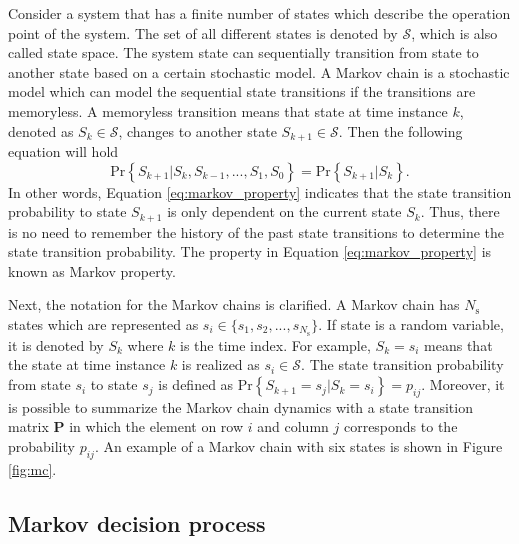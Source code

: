 \documentclass[english, 12pt, a4paper, elec, utf8, a-1b, online]{aaltothesis}
\renewcommand{\vec}[1]{\mathbf{#1}}
\newcommand{\Ss}{\mathcal{S}}
\renewcommand{\Pr}[1]{\text{Pr}\left\{ #1 \right\}}
\newcommand{\stprobs}{\vec{P}}
\newcommand{\nstates}{{N_\text{s}}}
\begin{document}
Consider a system that has a finite number of states which describe the operation point of the system.
The set of all different states is denoted by $\Ss$, which is also called state space.
The system state can sequentially transition from state to another state based on a certain stochastic model.
A Markov chain is a stochastic model which can model the sequential state transitions if the transitions are memoryless.
A memoryless transition means that state at time instance $k$, denoted as $S_k \in \Ss$, changes to another state $S_{k+1} \in \Ss$.
Then the following equation will hold   
\begin{equation} \label{eq:markov_property}
    \Pr{S_{k+1} | S_k, S_{k-1}, ..., S_1, S_0} = \Pr{S_{k+1} | S_k}.
\end{equation}
In other words, Equation \eqref{eq:markov_property} indicates that the state transition probability to state $S_{k+1}$ is only dependent on the current state $S_k$.
Thus, there is no need to remember the history of the past state transitions to determine the state transition probability.
The property in Equation \eqref{eq:markov_property} is known as Markov property.

Next, the notation for the Markov chains is clarified.
A Markov chain has $\nstates$ states which are represented as $s_i \in \{s_1, s_2, ..., s_{\nstates} \}$.
If state is a random variable, it is denoted by $S_k$ where $k$ is the time index.
For example, $S_k = s_i$ means that the state at time instance $k$ is realized as $s_i \in \Ss$. 
The state transition probability from state $s_i$ to state $s_j$ is defined as $\Pr{S_{k+1}=s_j | S_{k}=s_i}=p_{ij}$.
Moreover, it is possible to summarize the Markov chain dynamics with a state transition matrix $\stprobs$ in which the element on row $i$ and column $j$ corresponds to the probability $p_{ij}$.
An example of a Markov chain with six states is shown in Figure \ref{fig:mc}.

\subsection{Markov decision process} \label{sec:MDP}
\end{document}
